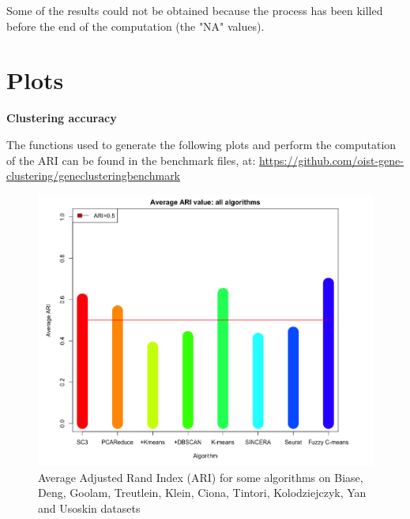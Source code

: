 \documentclass{report}
\begin{document}
{Some of the results could not be obtained because the process has been killed before the end of the computation (the "NA" values).

\section*{Plots}

\bigskip
\noindent \textbf{Clustering accuracy}
\bigskip

The functions used to generate the following plots and perform the computation of the ARI can be found in the benchmark files, at: {\url{https://github.com/oist-gene-clustering/geneclusteringbenchmark}}\\

\begin{figure}[H]
\centering
\includegraphics[scale=0.4]{benchmark/ariAverageAll.png}
\caption{Average Adjusted Rand Index (ARI) for some algorithms on Biase, Deng, Goolam, Treutlein, Klein, Ciona, Tintori, Kolodziejczyk, Yan and Usoskin datasets}
\label{averageARI}
\end{figure}

}
\end{document}
